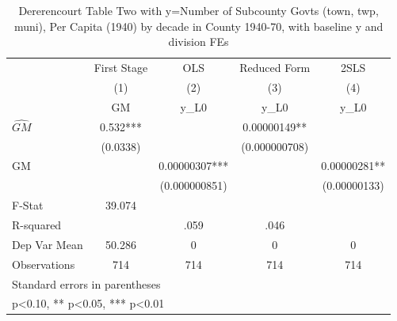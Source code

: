 \begin{table}[htbp]\centering
\def\sym#1{\ifmmode^{#1}\else\(^{#1}\)\fi}
\caption{Dererencourt Table Two with y=Number of Subcounty Govts (town, twp, muni), Per Capita (1940) by decade in County 1940-70, with baseline y and division FEs}
\begin{tabular}{l*{4}{c}}
\toprule
                    & First Stage   &         OLS   &Reduced Form   &        2SLS   \\
                    &\multicolumn{1}{c}{(1)}&\multicolumn{1}{c}{(2)}&\multicolumn{1}{c}{(3)}&\multicolumn{1}{c}{(4)}\\
                    &\multicolumn{1}{c}{GM}&\multicolumn{1}{c}{y\_L0}&\multicolumn{1}{c}{y\_L0}&\multicolumn{1}{c}{y\_L0}\\
\midrule
$\hat{GM}$          &       0.532***&               &  0.00000149** &               \\
                    &    (0.0338)   &               &(0.000000708)   &               \\
\addlinespace
GM                  &               &  0.00000307***&               &  0.00000281** \\
                    &               &(0.000000851)   &               &(0.00000133)   \\
\midrule
F-Stat              &      39.074   &               &               &               \\
R-squared           &               &        .059   &        .046   &               \\
Dep Var Mean        &      50.286   &           0   &           0   &           0   \\
Observations        &         714   &         714   &         714   &         714   \\
\bottomrule
\multicolumn{5}{l}{\footnotesize Standard errors in parentheses}\\
\multicolumn{5}{l}{\footnotesize * p<0.10, ** p<0.05, *** p<0.01}\\
\end{tabular}
\end{table}
